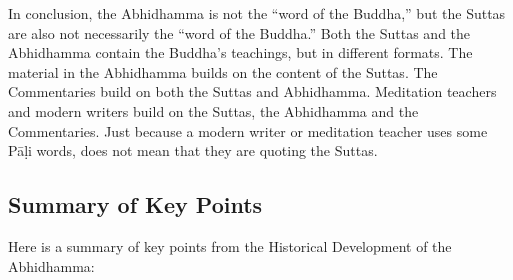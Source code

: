 In conclusion, the Abhidhamma is not the “word of the Buddha,” but the Suttas are also not necessarily the “word of the Buddha.” Both the Suttas and the Abhidhamma contain the Buddha’s teachings, but in different formats. The material in the Abhidhamma builds on the content of the Suttas. The Commentaries build on both the Suttas and Abhidhamma. Meditation teachers and modern writers build on the Suttas, the Abhidhamma and the Commentaries. Just because a modern writer or meditation teacher uses some Pāḷi words, does not mean that they are quoting the Suttas.

\subsection*{Summary of Key Points}

Here is a summary of key points from the Historical Development of the Abhidhamma:

